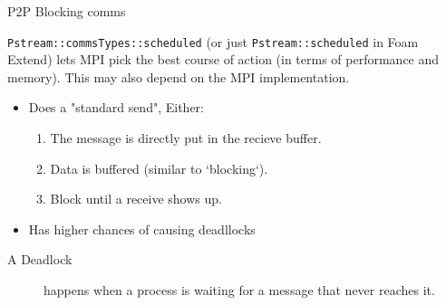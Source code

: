 \begin{frame}[fragile]{P2P Blocking comms}

    {\tt Pstream::commsTypes::scheduled} (or just {\tt Pstream::scheduled} in Foam Extend) lets MPI pick the best course of action
    (in terms of performance and memory). This may also depend on the MPI implementation.
    \begin{itemize}
        \item Does a "standard send", Either:
            \begin{enumerate}
                \item The message is directly put in the recieve buffer.
                \item Data is buffered (similar to `blocking`).
                \item Block until a receive shows up.
            \end{enumerate}
        \item Has higher chances of causing deadllocks
    \end{itemize}

    \begin{description}
        \item[A Deadlock] happens when a process is waiting for a message that never reaches it.
    \end{description}
\end{frame}



